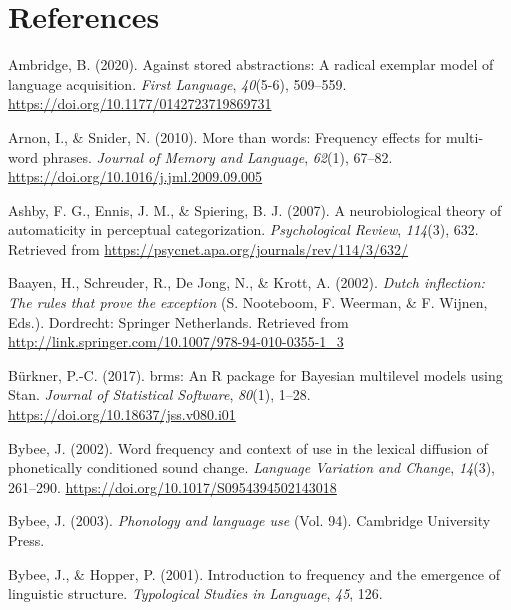 \documentclass[
  man,floatsintext]{apa6}
\newlength{\cslhangindent}
\newenvironment{CSLReferences}[2] %
 {\begin{list}{}{%
  \setlength{\itemindent}{0pt}
  \setlength{\leftmargin}{0pt}
  \setlength{\parsep}{0pt}
  \ifodd #1
   \setlength{\leftmargin}{\cslhangindent}
   \setlength{\itemindent}{-1\cslhangindent}
  \fi
  \setlength{\itemsep}{#2\baselineskip}}}
 {\end{list}}
\begin{document}
\newpage

\section{References}\label{references}

\label{refs}
\begin{CSLReferences}{1}{0}
Ambridge, B. (2020). Against stored abstractions: A radical exemplar model of language acquisition. \emph{First Language}, \emph{40}(5-6), 509--559. \url{https://doi.org/10.1177/0142723719869731}

Arnon, I., \& Snider, N. (2010). More than words: Frequency effects for multi-word phrases. \emph{Journal of Memory and Language}, \emph{62}(1), 67--82. \url{https://doi.org/10.1016/j.jml.2009.09.005}

Ashby, F. G., Ennis, J. M., \& Spiering, B. J. (2007). A neurobiological theory of automaticity in perceptual categorization. \emph{Psychological Review}, \emph{114}(3), 632. Retrieved from \url{https://psycnet.apa.org/journals/rev/114/3/632/}

Baayen, H., Schreuder, R., De Jong, N., \& Krott, A. (2002). \emph{Dutch inflection: The rules that prove the exception} (S. Nooteboom, F. Weerman, \& F. Wijnen, Eds.). Dordrecht: Springer Netherlands. Retrieved from \url{http://link.springer.com/10.1007/978-94-010-0355-1_3}

Bürkner, P.-C. (2017). {brms}: An {R} package for {Bayesian} multilevel models using {Stan}. \emph{Journal of Statistical Software}, \emph{80}(1), 1--28. \url{https://doi.org/10.18637/jss.v080.i01}

Bybee, J. (2002). Word frequency and context of use in the lexical diffusion of phonetically conditioned sound change. \emph{Language Variation and Change}, \emph{14}(3), 261--290. \url{https://doi.org/10.1017/S0954394502143018}

Bybee, J. (2003). \emph{Phonology and language use} (Vol. 94). Cambridge University Press.

Bybee, J., \& Hopper, P. (2001). Introduction to frequency and the emergence of linguistic structure. \emph{Typological Studies in Language}, \emph{45}, 126.


\end{CSLReferences}
\end{document}
